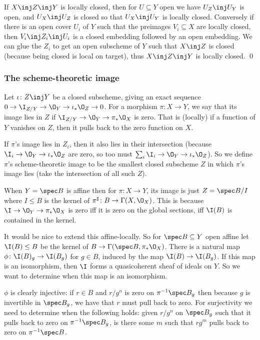     If $X\inj Z\inj Y$ is locally closed, then for $U\subseteq Y$ open we have $U_Z\inj U_Y$ is open,
    and $U_X\inj U_Z$ is closed so that $U_X\inj U_Y$ is locally closed.
    Conversely if there is an open cover $U_i$ of $Y$ such that the preimages $V_i\subseteq X$ are locally
    closed, then $V_i\inj Z_i\inj U_i$ is a closed embedding followed by an open embedding.
    We can glue the $Z_i$ to get an open subscheme of $Y$ such that $X\inj Z$ is closed (because being closed
    is local on target), thus $X\inj Z\inj Y$ is locally closed.
    \qed

\eproof

\subsubsection{The scheme-theoretic image}

\bdefn

    Let $\iota\colon Z\inj Y$ be a closed subscheme, giving an exact sequence
    $0\to\I_{Z/Y}\to\O_Y\to\iota_*\O_Z\to0$.
    For a morphism $\pi\colon X\to Y$, we say that its {\emphcolor image lies in $Z$} if
    $\I_{Z/Y}\to\O_Y\to\pi_*\O_X$ is zero.
    That is (locally) if a function of $Y$ vanishes on $Z$, then it pulls back to the zero function on $X$.

    If $\pi$'s image lies in $Z_i$, then it also lies in their intersection (because
    $\I_i\to\O_Y\to\iota_*\O_Z$ are zero, so too must $\sum_i\I_i\to\O_Y\to\iota_*\O_Z$).
    So we define $\pi$'s {\emphcolor scheme-theoretic image} to be the smallest closed subscheme $Z$ in which
    $\pi$'s image lies (take the intersection of all such $Z$).

\edefn

When $Y=\spec B$ is affine then for $\pi\colon X\to Y$, its image is just $Z=\spec B/I$ where $I\leq B$ is
the kernel of $\pi^\sharp\colon B\to\Gamma(X,\O_X)$.
This is because $\I\to\O_Y\to\pi_*\O_X$ is zero iff it is zero on the global sections, iff $\I(B)$ is contained
in the kernel.

It would be nice to extend this affine-locally.
So for $\spec B\subseteq Y$ open affine let $\I(B)\leq B$ be the kernel of $B\to\Gamma(\spec B,\pi_*\O_X)$.
There is a natural map $\phi\colon\I(B)_g\to\I(B_g)$ for $g\in B$, induced by the map $\I(B)\to\I(B_g)$.
If this map is an isomorphism, then $\I$ forms a quasicoherent sheaf of ideals on $Y$.
So we want to determine when this map is an isomorphism.

$\phi$ is clearly injective: if $r\in B$ and $r/g^n$ is zero on $\pi^{-1}\spec B_g$ then because $g$
is invertible in $\spec B_g$, we have that $r$ must pull back to zero.
For surjectivity we need to determine when the following holds: given $r/g^n$ on $\spec B_g$ such that
it pulls back to zero on $\pi^{-1}\spec B_g$, is there some $m$ such that $rg^m$ pulls back to zero
on $\pi^{-1}\spec B$.

